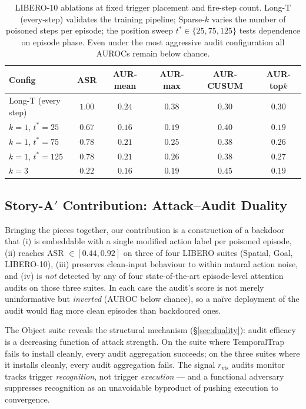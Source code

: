 \documentclass[11pt]{article}
\begin{document}
\begin{table}[t]
\centering
\caption{LIBERO-10 ablations at fixed trigger placement and fire-step
count. Long-T (every-step) validates the training pipeline; Sparse-$k$
varies the number of poisoned steps per episode; the position sweep
$t^* \in \{25, 75, 125\}$ tests dependence on episode phase. Even
under the most aggressive audit configuration all AUROCs remain below
chance.}
\label{tab:l10-ablations}
\begin{tabular}{lccccc}
\toprule
Config              & ASR    & AUR-mean & AUR-max & AUR-CUSUM & AUR-top$k$ \\
\midrule
Long-T (every step) & $1.00$ & $0.24$   & $0.38$  & $0.30$    & $0.30$     \\
$k{=}1$, $t^*{=}25$ & $0.67$ & $0.16$   & $0.19$  & $0.40$    & $0.19$     \\
$k{=}1$, $t^*{=}75$ & $0.78$ & $0.21$   & $0.25$  & $0.38$    & $0.26$     \\
$k{=}1$, $t^*{=}125$& $0.78$ & $0.21$   & $0.26$  & $0.38$    & $0.27$     \\
$k{=}3$             & $0.22$ & $0.16$   & $0.19$  & $0.45$    & $0.19$     \\
\bottomrule
\end{tabular}
\end{table}

\subsection{Story-A$'$ Contribution: Attack--Audit Duality}

Bringing the pieces together, our contribution is a construction of a
backdoor that (i) is embeddable with a single modified action label
per poisoned episode, (ii) reaches ASR $\in [0.44, 0.92]$ on three of
four LIBERO suites (Spatial, Goal, LIBERO-10), (iii) preserves
clean-input behaviour to within natural action noise, and (iv) is
\emph{not} detected by any of four state-of-the-art episode-level
attention audits on those three suites. In each case the audit's
score is not merely uninformative but \emph{inverted} (AUROC below
chance), so a naïve deployment of the audit would flag more clean
episodes than backdoored ones.

The Object suite reveals the structural mechanism (\S\ref{sec:duality}):
audit efficacy is a decreasing function of attack strength. On the
suite where TemporalTrap fails to install cleanly, every audit
aggregation succeeds; on the three suites where it installs cleanly,
every audit aggregation fails. The signal $r_{\mathrm{vis}}$ audits
monitor tracks trigger \emph{recognition}, not trigger
\emph{execution} --- and a functional adversary suppresses recognition
as an unavoidable byproduct of pushing execution to convergence.
\end{document}
